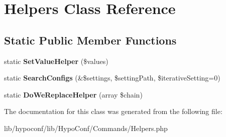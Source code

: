 \hypertarget{class_hypo_conf_1_1_commands_1_1_helpers}{
\section{\-Helpers \-Class \-Reference}
\label{class_hypo_conf_1_1_commands_1_1_helpers}
}
\subsection*{\-Static \-Public \-Member \-Functions}
\begin{DoxyCompactItemize}
\item 
\hypertarget{class_hypo_conf_1_1_commands_1_1_helpers_a6b227c096e1dede113e60c8a88dee8bb}{
static {\bfseries \-Set\-Value\-Helper} (\$values)}
\label{class_hypo_conf_1_1_commands_1_1_helpers_a6b227c096e1dede113e60c8a88dee8bb}

\item 
\hypertarget{class_hypo_conf_1_1_commands_1_1_helpers_a8464d6216910f5ae472a50700126a9f9}{
static {\bfseries \-Search\-Configs} (\&\$settings, \$setting\-Path, \$iterative\-Setting=0)}
\label{class_hypo_conf_1_1_commands_1_1_helpers_a8464d6216910f5ae472a50700126a9f9}

\item 
\hypertarget{class_hypo_conf_1_1_commands_1_1_helpers_ae5ffe2362119809861c439c2f9d857c9}{
static {\bfseries \-Do\-We\-Replace\-Helper} (array \$chain)}
\label{class_hypo_conf_1_1_commands_1_1_helpers_ae5ffe2362119809861c439c2f9d857c9}

\end{DoxyCompactItemize}


\-The documentation for this class was generated from the following file\-:\begin{DoxyCompactItemize}
\item 
lib/hypoconf/lib/\-Hypo\-Conf/\-Commands/\-Helpers.\-php\end{DoxyCompactItemize}
